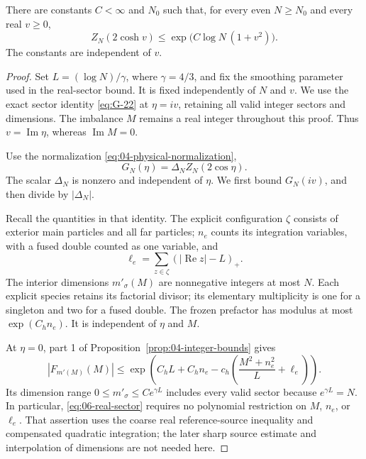 \begin{theorem}\label{E:all-fugacity-bound}
There are constants \(C<\infty\) and \(N_0\) such that, for every
even \(N\ge N_0\) and every real \(v\ge0\),
\begin{equation}
 Z_N(2\cosh v)
 \le \exp\!\bigl(C\log N\,(1+v^2)\bigr).
 \label{eq:06-all-fugacity}
\end{equation}
The constants are independent of \(v\).
\end{theorem}
\begin{proof}
Set \(L=(\log N)/\gamma\), where \(\gamma=4/3\), and fix the
smoothing parameter used in the real-sector bound. It is fixed
independently of \(N\) and \(v\). We use the exact sector identity
\eqref{eq:G-22} at \(\eta=iv\), retaining all valid integer sectors
and dimensions. The imbalance \(M\) remains a real integer throughout
this proof. Thus \(v=\operatorname{Im}\eta\), whereas
\(\operatorname{Im}M=0\).

Use the normalization \eqref{eq:04-physical-normalization},
\[
 G_N(\eta)=\Delta_N Z_N(2\cos\eta).
\]
The scalar \(\Delta_N\) is nonzero and independent of \(\eta\).
We first bound \(G_N(iv)\), and then divide by \(|\Delta_N|\).

Recall the quantities in that identity. The explicit configuration
\(\zeta\) consists of exterior main particles and all far particles;
\(n_e\) counts its integration variables, with a fused double counted
as one variable, and
\[
 \ell_e=\sum_{z\in\zeta}(|\operatorname{Re}z|-L)_+.
\]
The interior dimensions \(m'_\sigma(M)\) are nonnegative integers
at most \(N\). Each explicit species retains its factorial divisor;
its elementary multiplicity is one for a singleton and two for a
fused double. The frozen prefactor has modulus at most
\(\exp(C_hn_e)\). It is independent of \(\eta\) and \(M\).

At \(\eta=0\), part 1 of
Proposition~\ref{prop:04-integer-bounds} gives
\begin{equation}
 |F_{m'(M)}(M)|
 \le\exp\!\left(C_hL+C_hn_e
       -c_h\left(\frac{M^2+n_e^2}{L}+\ell_e\right)\right).
 \label{eq:06-real-sector}
\end{equation}
Its dimension range \(0\le m'_\sigma\le C e^{\gamma L}\) includes
every valid sector because \(e^{\gamma L}=N\). In particular,
\eqref{eq:06-real-sector} requires no polynomial restriction on
\(M\), \(n_e\), or \(\ell_e\). That assertion uses the coarse real
reference-source inequality and compensated quadratic integration;
the later sharp source estimate and interpolation of dimensions are
not needed here.


\end{proof}
